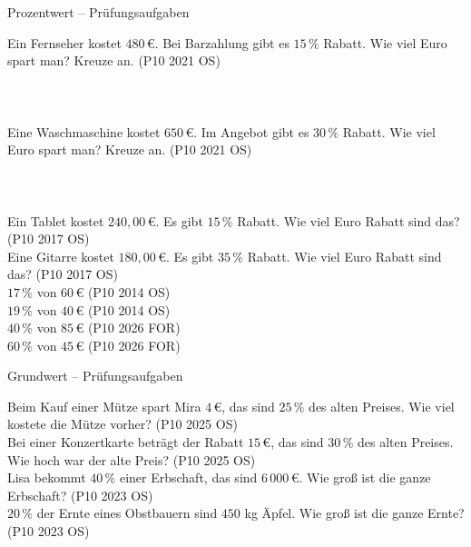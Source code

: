 \begin{aufgabe}{Prozentwert – Prüfungsaufgaben}
\begin{teile}
\teil Ein Fernseher kostet $480\,€$. Bei Barzahlung gibt es $15\,\%$ Rabatt. Wie viel Euro spart man? Kreuze an. \hfill (P10 2021 OS)\\ \\ \\ \\ 
\teil Eine Waschmaschine kostet $650\,€$. Im Angebot gibt es $30\,\%$ Rabatt. Wie viel Euro spart man? Kreuze an. \hfill (P10 2021 OS)\\ \\ \\ \\ 
\teil Ein Tablet kostet $240{,}00\,€$. Es gibt $15\,\%$ Rabatt. Wie viel Euro Rabatt sind das? \hfill (P10 2017 OS) \\ \leerfeld[€]
\teil Eine Gitarre kostet $180{,}00\,€$. Es gibt $35\,\%$ Rabatt. Wie viel Euro Rabatt sind das? \hfill (P10 2017 OS) \\ \leerfeld[€]
\teil $17\,\%$ von $60\,€$ \hfill (P10 2014 OS) \\ \leerfeld[€]
\teil $19\,\%$ von $40\,€$ \hfill (P10 2014 OS) \\ \leerfeld[€]
\teil $40\,\%$ von $85\,€$ \hfill (P10 2026 FOR) \\ \leerfeld[€]
\teil $60\,\%$ von $45\,€$ \hfill (P10 2026 FOR) \\ \leerfeld[€]
\end{teile}
\end{aufgabe}

\begin{aufgabe}{Grundwert – Prüfungsaufgaben}
\begin{teile}
\teil Beim Kauf einer Mütze spart Mira $4\,€$, das sind $25\,\%$ des alten Preises. Wie viel kostete die Mütze vorher? \hfill (P10 2025 OS) \\ \leerfeld[€]
\teil Bei einer Konzertkarte beträgt der Rabatt $15\,€$, das sind $30\,\%$ des alten Preises. Wie hoch war der alte Preis? \hfill (P10 2025 OS) \\ \leerfeld[€]
\teil Lisa bekommt $40\,\%$ einer Erbschaft, das sind $6\,000\,€$. Wie groß ist die ganze Erbschaft? \hfill (P10 2023 OS) \\ \leerfeld[€]
\teil $20\,\%$ der Ernte eines Obstbauern sind $450$ kg Äpfel. Wie groß ist die ganze Ernte? \hfill (P10 2023 OS) \\ \leerfeld[kg]
\end{teile}
\end{aufgabe}

